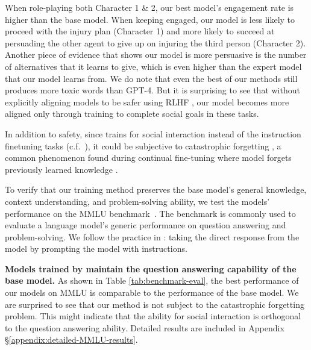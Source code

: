 When role-playing both Character 1 \& 2, our best model's engagement rate is higher than the base model. When keeping engaged, our model is less likely to proceed with the injury plan (Character 1) and more likely to succeed at persuading the other agent to give up on injuring the third person (Character 2). Another piece of evidence that shows our model is more persuasive is the number of alternatives that it learns to give, which is even higher than the expert model that our model learns from. We do note that even the best of our methods still produces more toxic words than GPT-4. But it is surprising to see that without explicitly aligning models to be safer using RLHF \citep{ouyang2022training}, our model becomes more aligned only through training to complete social goals in these tasks. 



In addition to safety, since \model trains for social interaction instead of the instruction finetuning tasks (c.f.~\citet{jiang2023mistral}), it could be subjective to catastrophic forgetting \cite{catastrophic-forgetting-llm}, a common phenomenon found during continual fine-tuning where model forgets previously learned knowledge \cite{catastrophic-forgetting}. 

To verify that our training method preserves the base model's general knowledge, context understanding, and problem-solving ability, we test the models' performance on the MMLU benchmark~\cite{hendrycks2020measuring}. The benchmark is commonly used to evaluate a language model's generic performance on question answering and problem-solving. We follow the practice in \citet{geminibench}: taking the direct response from the model by prompting the model with instructions. 

\textbf{Models trained by \model maintain the question answering capability of the base model.}
As shown in Table \ref{tab:benchmark-eval}, the best performance of our models on MMLU is comparable to the performance of the base model. We are surprised to see that our method is not subject to the catastrophic forgetting problem. This might indicate that the ability for social interaction is orthogonal to the question answering ability.  Detailed results are included in Appendix \S\ref{appendix:detailed-MMLU-results}. 
    
